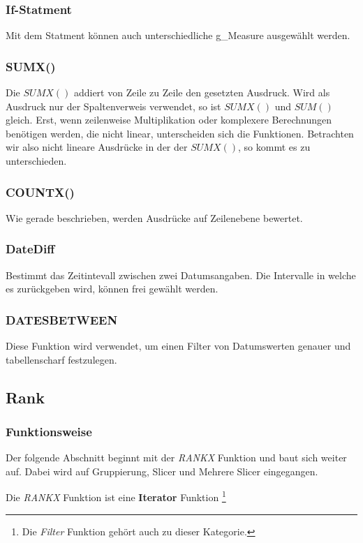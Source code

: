 \subsubsection{If-Statment}
Mit dem  Statment können auch unterschiedliche \gls{g_Measure} ausgewählt werden.


\subsubsection{SUMX()}
Die $SUMX()$ addiert von Zeile zu Zeile den gesetzten Ausdruck. Wird als Ausdruck nur der Spaltenverweis verwendet, so ist $SUMX()$ und $SUM()$ gleich. Erst, wenn zeilenweise Multiplikation oder komplexere Berechnungen benötigen werden, die nicht linear, unterscheiden sich die Funktionen. Betrachten wir also nicht lineare Ausdrücke in der der $SUMX()$, so kommt es zu unterschieden.
\subsubsection{COUNTX()}
Wie gerade beschrieben, werden Ausdrücke auf Zeilenebene bewertet.

\subsubsection{DateDiff}
Bestimmt das Zeitintevall zwischen zwei Datumsangaben. Die Intervalle in welche es zurückgeben wird, können frei gewählt werden.

\subsubsection{DATESBETWEEN}
Diese Funktion wird verwendet, um einen Filter von Datumswerten genauer und tabellenscharf festzulegen.

\subsection{Rank}
\subsubsection{Funktionsweise}
Der folgende Abschnitt beginnt mit der \textit{RANKX} Funktion und baut sich weiter auf. Dabei wird auf Gruppierung, Slicer und Mehrere Slicer eingegangen.

Die \textit{RANKX} Funktion ist eine \textbf{Iterator} Funktion \footnote{Die \textit{Filter} Funktion gehört auch zu dieser Kategorie.} \\

